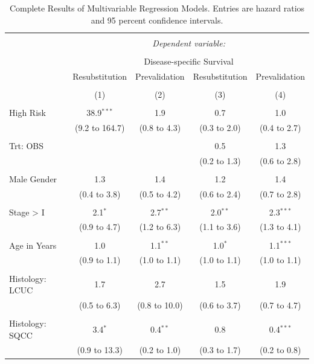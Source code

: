 \documentclass[11pt,]{article}
\begin{document}
\begin{table}[!htbp] \centering
  \caption{Complete Results of Multivariable Regression Models. Entries are hazard ratios and 95 percent confidence intervals.  \label{multimodel}}
  \label{}
\begin{tabular}{@{\extracolsep{5pt}}lcccc}
\\[-1.8ex]\hline
\hline \\[-1.8ex]
 & \multicolumn{4}{c}{\textit{Dependent variable:}} \\
\cline{2-5}
\\[-1.8ex] & \multicolumn{4}{c}{Disease-specific Survival} \\
 & Resubstitution & Prevalidation & Resubstitution & Prevalidation \\
\\[-1.8ex] & (1) & (2) & (3) & (4)\\
\hline \\[-1.8ex]
 High Risk & 38.9$^{***}$ & 1.9 & 0.7 & 1.0 \\
  & (9.2 to 164.7) & (0.8 to 4.3) & (0.3 to 2.0) & (0.4 to 2.7) \\
  & & & & \\
 Trt: OBS &  &  & 0.5 & 1.3 \\
  &  &  & (0.2 to 1.3) & (0.6 to 2.8) \\
  & & & & \\
 Male Gender & 1.3 & 1.4 & 1.2 & 1.4 \\
  & (0.4 to 3.8) & (0.5 to 4.2) & (0.6 to 2.4) & (0.7 to 2.8) \\
  & & & & \\
 Stage > I & 2.1$^{*}$ & 2.7$^{**}$ & 2.0$^{**}$ & 2.3$^{***}$ \\
  & (0.9 to 4.7) & (1.2 to 6.3) & (1.1 to 3.6) & (1.3 to 4.1) \\
  & & & & \\
 Age in Years & 1.0 & 1.1$^{**}$ & 1.0$^{*}$ & 1.1$^{***}$ \\
  & (0.9 to 1.1) & (1.0 to 1.1) & (1.0 to 1.1) & (1.0 to 1.1) \\
  & & & & \\
 Histology: LCUC & 1.7 & 2.7 & 1.5 & 1.9 \\
  & (0.5 to 6.3) & (0.8 to 10.0) & (0.6 to 3.7) & (0.7 to 4.7) \\
  & & & & \\
 Histology: SQCC & 3.4$^{*}$ & 0.4$^{**}$ & 0.8 & 0.4$^{***}$ \\
  & (0.9 to 13.3) & (0.2 to 1.0) & (0.3 to 1.7) & (0.2 to 0.8) \\

\end{tabular}
\end{table}
\end{document}
